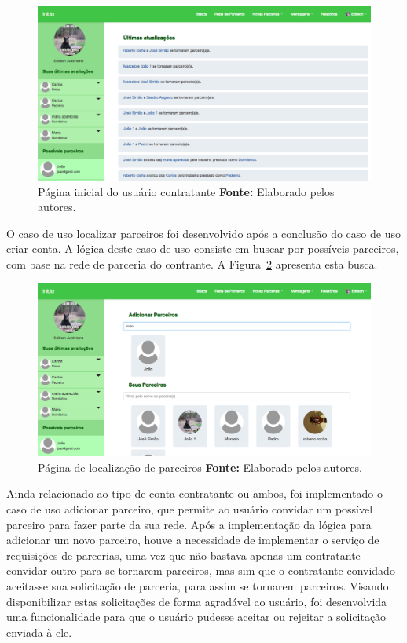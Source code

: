 \newpage
\begin{figure}[h!]
	\centerline{\includegraphics[scale=0.3]{./imagens/home-contratante.png}}
	\caption[Página inicial do usuário contratante]
	{Página inicial do usuário contratante \textbf{Fonte:} Elaborado pelos autores.}
	\label{fig:pagina_inicial_contratante}
\end{figure}


\par O caso de uso localizar parceiros foi desenvolvido após a conclusão do caso de uso criar conta. A lógica deste caso de uso consiste em buscar por possíveis parceiros, com base na rede de parceria do contrante. A Figura~\ref{fig:pagina_localizar_parceiro} apresenta esta busca.

\begin{figure}[h!]
	\centerline{\includegraphics[scale=0.3]{./imagens/localizar-parceiro.png}}
	\caption[Página de localização de parceiros]
	{Página de localização de parceiros \textbf{Fonte:} Elaborado pelos autores.}
	\label{fig:pagina_localizar_parceiro}
\end{figure}

\par Ainda relacionado ao tipo de conta contratante ou ambos, foi implementado o caso de uso adicionar parceiro, que permite ao usuário convidar um possível parceiro para fazer parte da sua rede. Após a implementação da lógica para adicionar um novo parceiro, houve a necessidade de implementar o serviço de requisições de parcerias, uma vez que não bastava apenas um contratante convidar outro para se tornarem parceiros, mas sim que o contratante convidado aceitasse sua solicitação de parceria, para assim se tornarem parceiros. Visando disponibilizar estas solicitações de forma agradável ao usuário, foi desenvolvida uma funcionalidade para que o usuário pudesse aceitar ou rejeitar a solicitação enviada à ele.

